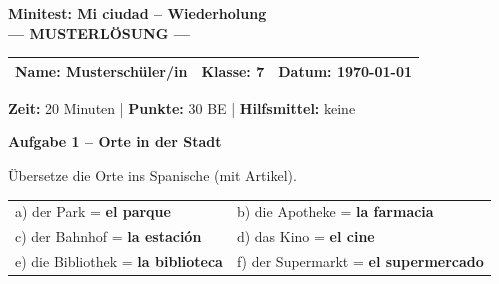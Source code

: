 \documentclass[11pt, a4paper]{article}
\newcommand{\fachfarbe}{spanisch}
\newcommand{\thema}{Minitest: Mi ciudad -- Wiederholung}
\newcommand{\klasse}{7}
\newcommand{\maxpunkte}{30}
\newcommand{\zeit}{20 Minuten}
\newcommand{\datum}{\today}
\newcommand{\punktebox}[1]{\hfill\fbox{\small \_\_\_/#1}}
\newcommand{\lsg}[1]{\textcolor{loesung}{\textbf{#1}}}
\newenvironment{aufgabe}[1]{%
    \needspace{5\baselineskip}%
    \nopagebreak[4]%
    \vspace{10pt}
    \noindent\textbf{\textcolor{\fachfarbe}{Aufgabe #1}}
    \nopagebreak[4]%
    \vspace{5pt}
    \nopagebreak[4]%
    \begin{list}{}{\leftmargin=0pt}
    \item[]
}{%
    \end{list}
}
\begin{document}

\begin{center}
    {\Large\bfseries\textcolor{\fachfarbe}{\thema}}\\[0.3em]
    {\large\textcolor{loesung}{\textbf{--- MUSTERLÖSUNG ---}}}
\end{center}

\vspace{5pt}

\noindent
\begin{tabularx}{\textwidth}{|X|X|X|}
\hline
\textbf{Name:} \lsg{Musterschüler/in} &
\textbf{Klasse:} \klasse &
\textbf{Datum:} \datum \\
\hline
\end{tabularx}

\vspace{10pt}

\begin{infobox}
\textbf{Zeit:} \zeit{} | \textbf{Punkte:} \maxpunkte{} BE | \textbf{Hilfsmittel:} keine
\end{infobox}

\vspace{15pt}


\begin{aufgabe}{1 -- Orte in der Stadt}
Übersetze die Orte ins Spanische (mit Artikel). \punktebox{6}
\end{aufgabe}

\noindent
\begin{tabular}{p{}p{}}
a) der Park = \lsg{el parque} & b) die Apotheke = \lsg{la farmacia} \\[0.8em]
c) der Bahnhof = \lsg{la estación} & d) das Kino = \lsg{el cine} \\[0.8em]
e) die Bibliothek = \lsg{la biblioteca} & f) der Supermarkt = \lsg{el supermercado} \\
\end{tabular}

\vspace{15pt}

\end{document}
